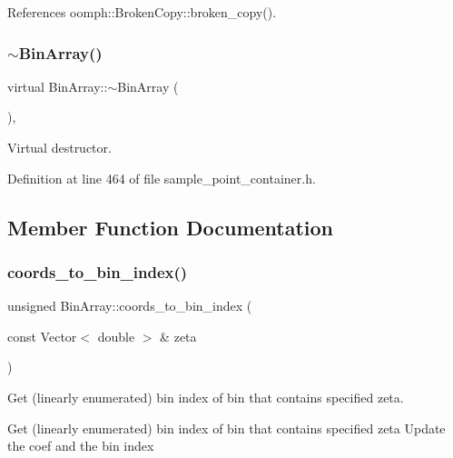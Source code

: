 References oomph\+::\+Broken\+Copy\+::broken\+\_\+copy().

\mbox{\label{classBinArray_ab29e48e0bc2242673fac09b245714d4e}} 
\subsubsection{\texorpdfstring{$\sim$\+Bin\+Array()}{~BinArray()}}
{\footnotesize\ttfamily virtual Bin\+Array\+::$\sim$\+Bin\+Array (\begin{DoxyParamCaption}{ }\end{DoxyParamCaption})\hspace{0.3cm}{\ttfamily [inline]}, {\ttfamily [virtual]}}



Virtual destructor. 



Definition at line 464 of file sample\+\_\+point\+\_\+container.\+h.



\subsection{Member Function Documentation}
\mbox{\label{classBinArray_ae57a55f73048b7c209fdff93725c4049}} 
\subsubsection{\texorpdfstring{coords\+\_\+to\+\_\+bin\+\_\+index()}{coords\_to\_bin\_index()}}
{\footnotesize\ttfamily unsigned Bin\+Array\+::coords\+\_\+to\+\_\+bin\+\_\+index (\begin{DoxyParamCaption}\item[{const Vector$<$ double $>$ \&}]{zeta }\end{DoxyParamCaption})}



Get (linearly enumerated) bin index of bin that contains specified zeta. 

Get (linearly enumerated) bin index of bin that contains specified zeta Update the coef and the bin index 

